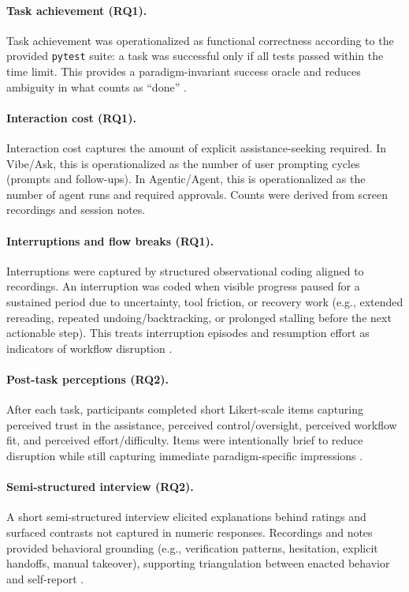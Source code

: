 \paragraph{Task achievement (RQ1).}
Task achievement was operationalized as functional correctness according to the provided \texttt{pytest} suite: a task was successful only if all tests passed within the time limit. This provides a paradigm-invariant success oracle and reduces ambiguity in what counts as ``done'' \parencite{sweBenchmark,pytestDocs}.

\paragraph{Interaction cost (RQ1).}
Interaction cost captures the amount of explicit assistance-seeking required. In Vibe/Ask, this is operationalized as the number of user prompting cycles (prompts and follow-ups). In Agentic/Agent, this is operationalized as the number of agent runs and required approvals. Counts were derived from screen recordings and session notes.

\paragraph{Interruptions and flow breaks (RQ1).}
Interruptions were captured by structured observational coding aligned to recordings. An interruption was coded when visible progress paused for a sustained period due to uncertainty, tool friction, or recovery work (e.g., extended rereading, repeated undoing/backtracking, or prolonged stalling before the next actionable step). This treats interruption episodes and resumption effort as indicators of workflow disruption \parencite{parnin2011resumption,abad2018taskInterruption,meyer2014productivity}.

\paragraph{Post-task perceptions (RQ2).}
After each task, participants completed short Likert-scale items capturing perceived trust in the assistance, perceived control/oversight, perceived workflow fit, and perceived effort/difficulty. Items were intentionally brief to reduce disruption while still capturing immediate paradigm-specific impressions \parencite{likert1932technique,barke2023trust}.

\paragraph{Semi-structured interview (RQ2).}
A short semi-structured interview elicited explanations behind ratings and surfaced contrasts not captured in numeric responses. Recordings and notes provided behavioral grounding (e.g., verification patterns, hesitation, explicit handoffs, manual takeover), supporting triangulation between enacted behavior and self-report \parencite{wohlin2012experimentation}.

